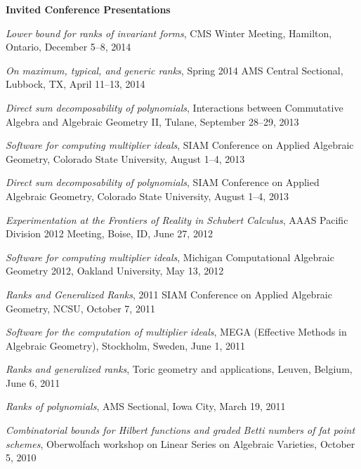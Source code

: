 \documentclass[12pt]{article}
\begin{document}
\textbf{Invited Conference Presentations}
\begin{description}
\setlength{}
\item[] \textit{Lower bound for ranks of invariant forms},
CMS Winter Meeting, Hamilton, Ontario,
December 5--8, 2014

\item[] \textit{On maximum, typical, and generic ranks},
Spring 2014 AMS Central Sectional, Lubbock, TX,
April 11--13, 2014

\item[] \textit{Direct sum decomposability of polynomials},
Interactions between Commutative Algebra and Algebraic Geometry II,
Tulane,
September 28--29, 2013

\item[] \textit{Software for computing multiplier ideals},
SIAM Conference on Applied Algebraic Geometry,
Colorado State University,
August 1--4, 2013

\item[] \textit{Direct sum decomposability of polynomials},
SIAM Conference on Applied Algebraic Geometry,
Colorado State University,
August 1--4, 2013

\item[] \textit{Experimentation at the Frontiers of Reality in Schubert Calculus},
AAAS Pacific Division 2012 Meeting,
Boise, ID, June 27, 2012

\item[] \textit{Software for computing multiplier ideals},
Michigan Computational Algebraic Geometry 2012,
Oakland University, May 13, 2012

\item[] \textit{Ranks and Generalized Ranks},
2011 SIAM Conference on Applied Algebraic Geometry,
NCSU, October 7, 2011

\item[] \textit{Software for the computation of multiplier ideals},
MEGA (Effective Methods in Algebraic Geometry), Stockholm, Sweden, June 1, 2011

\item[] \textit{Ranks and generalized ranks},
Toric geometry and applications, Leuven, Belgium, June 6, 2011

\item[] \textit{Ranks of polynomials}, AMS Sectional, Iowa City, March 19, 2011

\item[] \textit{Combinatorial bounds for Hilbert functions and graded Betti numbers of fat point schemes},
Oberwolfach workshop on Linear Series on Algebraic Varieties, October 5, 2010


\end{description}
\end{document}
